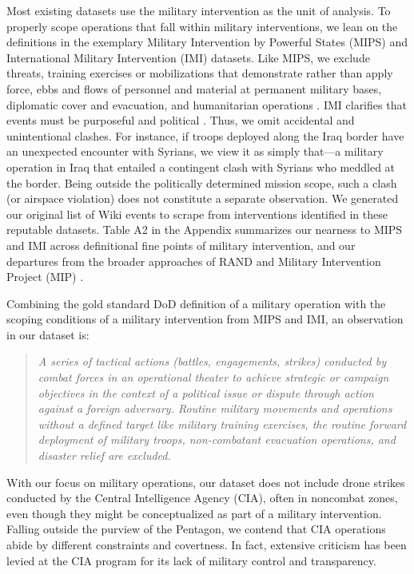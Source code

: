 \documentclass[fleqn,12pt]{article}
\begin{document}
Most existing datasets use the military intervention as the unit of analysis. To properly scope operations that fall within military interventions, we lean on the definitions in the exemplary Military Intervention by Powerful States (MIPS) and International Military Intervention (IMI) datasets. Like MIPS, we exclude threats, training exercises or mobilizations that demonstrate rather than apply force, ebbs and flows of personnel and material at permanent military bases, diplomatic cover and evacuation, and humanitarian operations \citep{sullivan_militaryinterventionpowerful_2009}. IMI clarifies that events must be purposeful and political \citep{pearson_internationalmilitaryinterventions_1988, pickering_internationalmilitaryintervention_2009}. Thus, we omit accidental and unintentional clashes. For instance, if troops deployed along the Iraq border have an unexpected encounter with Syrians, we view it as simply that—a military operation in Iraq that entailed a contingent clash with Syrians who meddled at the border. Being outside the politically determined mission scope, such a clash (or airspace violation) does not constitute a separate observation. We generated our original list of Wiki events to scrape from interventions identified in these reputable datasets. Table A2 in the Appendix summarizes our nearness to MIPS and IMI across definitional fine points of military intervention, and our departures from the broader approaches of RAND \citep{kavanagh_characteristicssuccessfulmilitary_2019} and Military Intervention Project (MIP) \citep{kushi_introducingmilitaryintervention_2023}. 

Combining the gold standard DoD definition of a military operation with the scoping conditions of a military intervention from MIPS and IMI, an observation in our dataset is:

    \begin{quote}\singlespacing
    \textit{A series of tactical actions (battles, engagements, strikes) conducted by combat forces in an operational theater to achieve strategic or campaign objectives in the context of a political issue or dispute through action against a foreign adversary. Routine military movements and operations without a defined target like military training exercises, the routine forward deployment of military troops, non-combatant evacuation operations, and disaster relief are excluded.}
    \end{quote}

With our focus on military operations, our dataset does not include drone strikes conducted by the Central Intelligence Agency (CIA), often in noncombat zones, even though they might be conceptualized as part of a military intervention. Falling outside the purview of the Pentagon, we contend that CIA operations abide by different constraints and covertness. In fact, extensive criticism has been levied at the CIA program for its lack of military control and transparency. 
\end{document}
